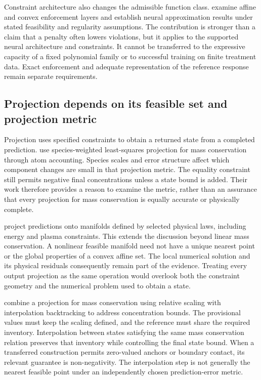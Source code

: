 Constraint architecture also changes the admissible function class. \citet{Min2024} examine affine and convex enforcement layers and establish neural approximation results under stated feasibility and regularity assumptions. The contribution is stronger than a claim that a penalty often lowers violations, but it applies to the supported neural architecture and constraints. It cannot be transferred to the expressive capacity of a fixed polynomial family or to successful training on finite treatment data. Exact enforcement and adequate representation of the reference response remain separate requirements.

\subsection{Projection depends on its feasible set and projection metric}

Projection uses specified constraints to obtain a returned state from a completed prediction. \citet{SturmSilva2024} use species-weighted least-squares projection for mass conservation through atom accounting. Species scales and error structure affect which component changes are small in that projection metric. The equality constraint still permits negative final concentrations unless a state bound is added. Their work therefore provides a reason to examine the metric, rather than an assurance that every projection for mass conservation is equally accurate or physically complete.

\citet{Valente2025} project predictions onto manifolds defined by selected physical laws, including energy and plasma constraints. This extends the discussion beyond linear mass conservation. A nonlinear feasible manifold need not have a unique nearest point or the global properties of a convex affine set. The local numerical solution and its physical residuals consequently remain part of the evidence. Treating every output projection as the same operation would overlook both the constraint geometry and the numerical problem used to obtain a state.

\citet{KircherVotsmeier2025} combine a projection for mass conservation using relative scaling with interpolation backtracking to address concentration bounds. The provisional values must keep the scaling defined, and the reference must share the required inventory. Interpolation between states satisfying the same mass conservation relation preserves that inventory while controlling the final state bound. When a transferred construction permits zero-valued anchors or boundary contact, its relevant guarantee is non-negativity. The interpolation step is not generally the nearest feasible point under an independently chosen prediction-error metric.

